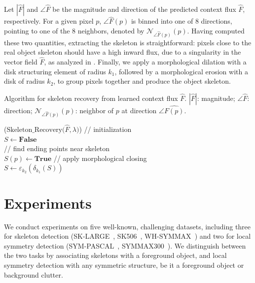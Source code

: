 \documentclass[10pt,twocolumn,letterpaper]{article}
\begin{document}
Let $|\hat{F}|$ and $\angle \hat{F}$ be the magnitude and direction of the predicted context flux $\hat{F}$, respectively.
For a given pixel $p$, $\angle \hat{F}(p)$ is binned into one of 8 directions, pointing to one of the 8 neighbors, denoted by $\mathcal{N}_{\angle \hat{F}(p)}(p)$.
Having computed these two quantities, extracting the skeleton is straightforward:
pixels close to the real object skeleton should have a high inward flux, due to a singularity in the vector field $\hat{F}$, as analyzed in \cite{dimitrov2003}.
Finally, we apply a morphological dilation with a disk structuring element of radius $k_1$, followed by a morphological erosion with a disk of radius $k_2$, to group pixels together and produce the object skeleton.

\begin{algorithm}[t]
\caption{Algorithm for skeleton recovery from learned context flux $\hat{F}$. $|\hat{F}|$: magnitude; $\angle \hat{F}$: direction; $\mathcal{N}_{\angle \hat{F}(p)}(p)$: neighbor of $p$ at direction $\angle \hat{F(p)}$.}
\label{algo:skeletonrecovery}
\DontPrintSemicolon

\Begin($\text{Skeleton\_Recovery} {(} \hat{F}, \lambda {)}$)
{
    // initialization \\
    $S \gets \textbf{False}$ \\
    // find ending points near skeleton \\
    {
        {
        	$S(p) \gets \textbf{True}$
        }
    }
    // apply morphological closing \\
    $S \gets \varepsilon_{k_2}(\delta_{k_1}(S))$ \;
     \;
}
\end{algorithm}

\section{Experiments} \label{sec:experiments}
We conduct experiments on five well-known, challenging datasets, including three for skeleton detection (SK-LARGE~\cite{shen2017lmsds}, SK506~\cite{shen2016fsds}, WH-SYMMAX~\cite{shen2016misl}) and two for local symmetry detection (SYM-PASCAL~\cite{ke2017srn}, SYMMAX300~\cite{tsogkas2012mil}).
We distinguish between the two tasks by associating skeletons with a foreground object, and local symmetry detection with any symmetric structure, be it a foreground object or background clutter.
\end{document}
